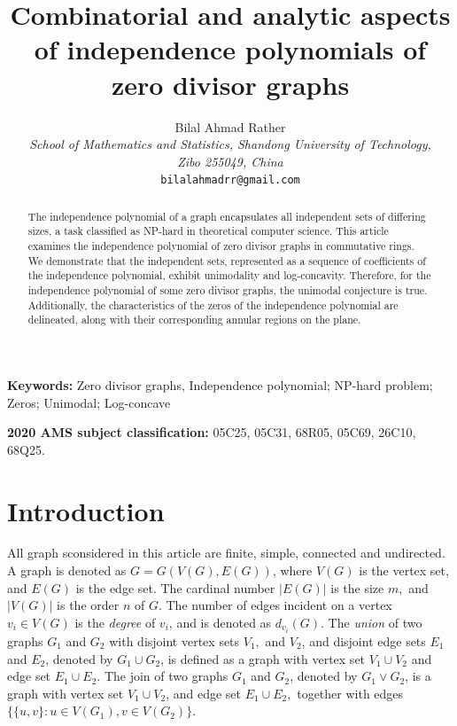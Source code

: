 \documentclass[12pt,twoside]{article}
\providecommand{\keywords}[1]
{
	\noindent\textbf{Keywords:} #1
}
\providecommand{\ams}[2]
{
	\noindent\textbf{2020 AMS subject classification:} #2
}
\begin{document}
\title{Combinatorial and analytic aspects of independence polynomials of zero divisor graphs}
\author{Bilal Ahmad Rather\\%
	{\em\small School of Mathematics and Statistics, Shandong University of Technology,}\\
	{\em \small Zibo 255049, China}\\
	\texttt{bilalahmadrr@gmail.com}
				}
				
\date{}

\pagestyle{myheadings} 
\maketitle

\begin{abstract}
The independence polynomial of a graph encapsulates all independent sets of differing sizes, a task classified as NP-hard in theoretical computer science. This article examines the independence polynomial of zero divisor graphs in commutative rings. We demonstrate that the independent sets, represented as a sequence of coefficients of the independence polynomial, exhibit unimodality and log-concavity. Therefore, for the independence polynomial of some zero divisor graphs, the unimodal conjecture is true. Additionally, the characteristics of the zeros of the independence polynomial are delineated, along with their corresponding annular regions on the plane. 
\end{abstract} 
 
\keywords{Zero divisor graphs, Independence polynomial;  NP-hard problem; Zeros; Unimodal; Log-concave}

\ams{}{05C25, 05C31, 68R05, 05C69, 26C10, 68Q25.}
\section{Introduction}
All graph sconsidered in this article are finite, simple, connected and undirected.  A graph is denoted as $G=G(V(G),E(G))$, where $V(G)$ is the vertex set, and $E(G)$ is the edge set. The cardinal number $|E(G)|$ is the size $m,$ and $|V(G)| $ is the order $n$ of $G$. The number of edges incident on a vertex $ v_{i}\in V(G) $ is the \textit{degree} of $v_{i}$, and is denoted as $ d_{v_{i}}(G) $.  The \textit{union} of two graphs $ G_{1}$ and $ G_{2}$ with disjoint vertex sets $V_{1}, $ and $ V_{2}$, and disjoint edge sets $E_{1}$ and $E_{2}$,  denoted by $ G_{1}\cup G_{2}$,  is defined as a graph with vertex set $ V_{1}\cup V_{2} $ and edge set $ E_{1}\cup E_{2}. $ 
The join of two graphs $ G_{1}$ and $ G_{2}$, denoted by $G_{1}\vee G_{2}$, is a graph with vertex set $V_{1}\cup V_{2}$, and edge set $E_{1}\cup E_{2}, $ together with edges $\big\{\{u,v\} : u\in V(G_{1}), v\in V(G_{2}) \big\}.$\vskip 1mm
\end{document}
